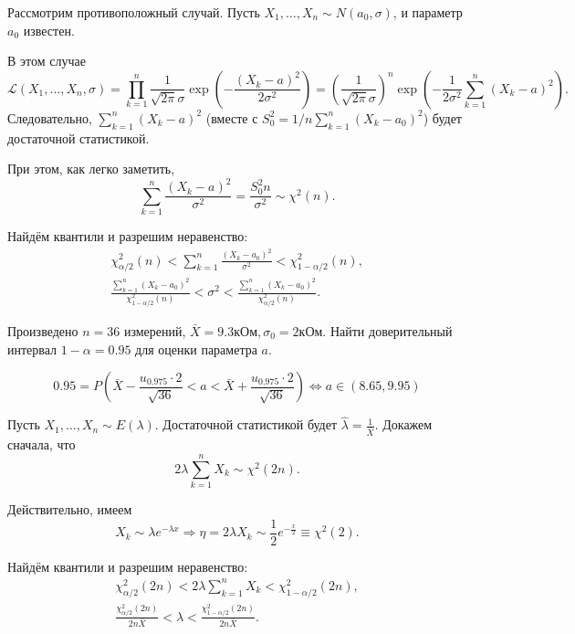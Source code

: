  \begin{ex}
  Рассмотрим противоположный случай. Пусть $X_1, \dots, X_n \sim N(a_0,
	\sigma)$,
	и параметр $a_0$ известен.

	В этом случае
	\[
		\mathscr{L} (X_1, \dots, X_n, \sigma) = \prod_{k=1}^n \frac{1}{\sqrt{2\pi}
		\sigma} \exp\left(-\frac{(X_k - a)^2}{2\sigma^2}\right) =
		\left(\frac{1}{\sqrt{2\pi}\sigma}\right)^n \exp\left(-\frac{1}{2\sigma^2}
		\sum_{k=1}^n (X_k-a)^2\right).
	\]
	Следовательно, $\sum_{k=1}^n (X_k-a)^2$ (вместе с $ S_0^2 = 1/n \sum_{k=1}^n(X_k - a_0)^2 $) будет достаточной статистикой.

	При этом, как легко заметить,
	\[
		\sum\limits_{k=1}^n \frac{(X_k-a)^2}{\sigma^2} = \frac{S^2_0 n}{\sigma^2}
		\sim \chi^2 (n).
	\]

	Найдём квантили и разрешим неравенство:
  \begin{gather*} 
		\chi^2_{\alpha/2} (n) < \sum_{k=1}^n \frac{(X_k - a_0)^2}{\sigma^2} <
		\chi^2_{1 - \alpha/2} (n), \\
		\frac{\sum_{k=1}^n (X_k-a_0)^2}{\chi^2_{1 - \alpha/2} (n)} < \sigma^2 <
		\frac{\sum_{k=1}^n (X_k - a_0)^2}{\chi^2_{\alpha/2}(n)}.
  \end{gather*}
\end{ex}

\begin{ex}
  Произведено $n=36$ измерений, $\bar X = 9.3 \text{кОм},  \sigma_0 = 2
	\text{кОм}$. Найти доверительный интервал $1- \alpha = 0.95$ для оценки
	параметра $a$.

\[
  0.95 = P\left(\bar X - \frac{u_{0.975} \cdot 2}{\sqrt{36}} < a < \bar X + \frac{u_{0.975} \cdot 2}{\sqrt{36}}\right) \Leftrightarrow a \in (8.65, 9.95)
\]
\end{ex}

\begin{ex}
	Пусть
  $X_1, \dots, X_n \sim E(\lambda)$.
  Достаточной статистикой  будет $\hat \lambda = \frac{1}{\bar X}$. Докажем
	сначала, что
  \[
		2\lambda \sum_{k=1}^n X_k \sim \chi^2(2n).
	\]

	Действительно, имеем
	\[
		X_k \sim \lambda e^{-\lambda x} \Rightarrow \eta = 2\lambda X_k \sim \frac{1}{2}
		e^{-\frac{x}{2}} \equiv \chi^2 (2).
	\]

	Найдём квантили и разрешим неравенство: 
	\begin{gather*}
		\chi^2_{\alpha/2}(2n) < 2\lambda\sum_{k=1}^n X_k <
		\chi^2_{1-\alpha/2}(2n),\\
	\frac{\chi^2_{\alpha/2}(2n)}{2 n\bar X } < \lambda <
	\frac{\chi^2_{1-\alpha/2}(2n)}{2 n \bar X}.
	\end{gather*}
\end{ex}

